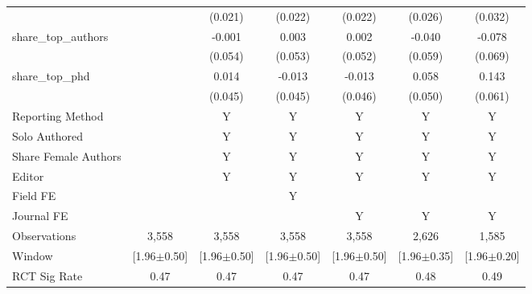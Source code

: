 {\begin{tabular}{l*{6}{c}}
                &                  &  (0.021)         &  (0.022)         &  (0.022)         &  (0.026)         &  (0.032)         \\
share\_top\_authors&                  &   -0.001         &    0.003         &    0.002         &   -0.040         &   -0.078         \\
                &                  &  (0.054)         &  (0.053)         &  (0.052)         &  (0.059)         &  (0.069)         \\
share\_top\_phd   &                  &    0.014         &   -0.013         &   -0.013         &    0.058         &    0.143\sym{**} \\
                &                  &  (0.045)         &  (0.045)         &  (0.046)         &  (0.050)         &  (0.061)         \\
Reporting Method &                  &        Y         &        Y         &        Y         &        Y         &        Y         \\
Solo Authored   &                  &        Y         &        Y         &        Y         &        Y         &        Y         \\
Share Female Authors &                  &        Y         &        Y         &        Y         &        Y         &        Y         \\
Editor          &                  &        Y         &        Y         &        Y         &        Y         &        Y         \\
Field FE        &                  &                  &        Y         &                  &                  &                  \\
Journal FE      &                  &                  &                  &        Y         &        Y         &        Y         \\
\hline
Observations    &    3,558         &    3,558         &    3,558         &    3,558         &    2,626         &    1,585         \\
Window          &[1.96$\pm$0.50]         &[1.96$\pm$0.50]         &[1.96$\pm$0.50]         &[1.96$\pm$0.50]         &[1.96$\pm$0.35]         &[1.96$\pm$0.20]         \\
RCT Sig Rate    &    0.47&    0.47&    0.47&    0.47&    0.48&    0.49\\
\hline\hline
\end{tabular}
}
